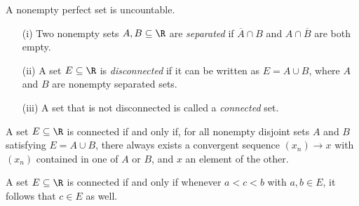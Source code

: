 \begin{tcolorbox}
\begin{thm}
A nonempty perfect set is uncountable.
\end{thm}
\end{tcolorbox}

\begin{tcolorbox}
\begin{defn}
\begin{enumerate}
    \item[(i)] Two nonempty sets \( A,B \subseteq \R   \) are \textit{separated} if \( \overline{A} \cap B  \) and \( A \cap \overline{B} \) are both empty.
    \item[(ii)] A set \( E \subseteq \R  \) is \textit{disconnected}  if it can be written as \( E = A \cup B \), where \( A  \) and \( B \) are nonempty separated sets.
    \item[(iii)] A set that is not disconnected is called a \textit{connected} set. 
\end{enumerate}
\end{defn}
\end{tcolorbox}

\begin{tcolorbox}
\begin{thm}
A set \( E \subseteq \R \) is connected if and only if, for all nonempty disjoint sets \( A \) and \( B \) satisfying \( E = A \cup B \), there always exists a convergent sequence \( (x_n) \to x  \) with \( (x_n) \) contained in one of \( A \) or \( B \), and \( x  \) an element of the other.
\end{thm}
\end{tcolorbox}

\begin{tcolorbox}
\begin{thm}
A set \( E \subseteq \R  \) is connected if and only if whenever \( a < c < b  \) with \( a,b \in E \), it follows that \( c \in E  \) as well.
\end{thm}
\end{tcolorbox}
